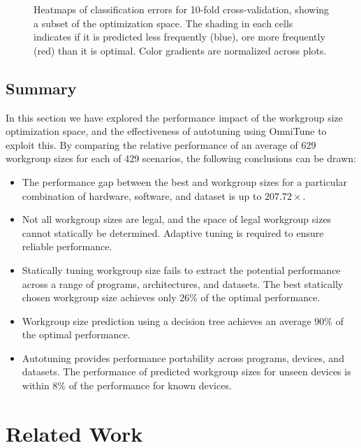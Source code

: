\begin{figure}
\begin{subfigure}[t]{0.28\columnwidth}
\vspace{-1.5em} %
\caption{}
\label{fig:class-hmaps-6}
\end{subfigure}
\caption[Classification error heatmaps]{%
  Heatmaps of classification errors for 10-fold cross-validation,
  showing a subset of the optimization space. The shading in each
  cells indicates if it is predicted less frequently (blue), ore more
  frequently (red) than it is optimal. Color gradients are normalized
  across plots.%
}
\label{fig:class-hmaps}
\end{figure}


\subsection{Summary}

In this section we have explored the performance impact of the
workgroup size optimization space, and the effectiveness of autotuning
using OmniTune to exploit this. By comparing the relative performance
of an average of 629 workgroup sizes for each of 429 scenarios, the
following conclusions can be drawn:

%
\begin{itemize}
\item The performance gap between the best and workgroup sizes for a
  particular combination of hardware, software, and dataset is up to
  $207.72\times$.
\item Not all workgroup sizes are legal, and the space of legal
  workgroup sizes cannot statically be determined. Adaptive tuning is
  required to ensure reliable performance.
\item Statically tuning workgroup size fails to extract the potential
  performance across a range of programs, architectures, and
  datasets. The best statically chosen workgroup size achieves only
  26\% of the optimal performance.
\item Workgroup size prediction using a decision tree achieves an
  average 90\% of the optimal performance.
\item Autotuning provides performance portability across programs,
  devices, and datasets. The performance of predicted workgroup sizes
  for unseen devices is within 8\% of the performance for known
  devices.
\end{itemize}


\section{Related Work}\label{sec:related}


